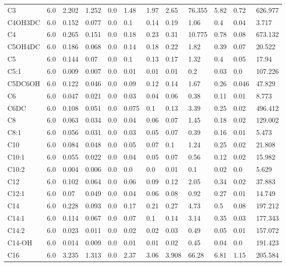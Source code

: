 \begin{tabular}{llllllllllll}
C3 & 6.0 & 2.202 & 1.252 & 0.0 & 1.48 & 1.97 & 2.65 & 76.355 & 5.82 & 0.72 & 626.977 \\
C4OH\C3DC & 6.0 & 0.152 & 0.077 & 0.0 & 0.1 & 0.14 & 0.19 & 1.06 & 0.4 & 0.04 & 3.717 \\
C4 & 6.0 & 0.265 & 0.151 & 0.0 & 0.18 & 0.23 & 0.31 & 10.775 & 0.78 & 0.08 & 673.132 \\
C5OH\C4DC & 6.0 & 0.186 & 0.068 & 0.0 & 0.14 & 0.18 & 0.22 & 1.82 & 0.39 & 0.07 & 20.522 \\
C5 & 6.0 & 0.144 & 0.07 & 0.0 & 0.1 & 0.13 & 0.17 & 1.32 & 0.4 & 0.05 & 17.94 \\
C5:1 & 6.0 & 0.009 & 0.007 & 0.0 & 0.01 & 0.01 & 0.01 & 0.2 & 0.03 & 0.0 & 107.226 \\
C5DC\C6OH & 6.0 & 0.122 & 0.046 & 0.0 & 0.09 & 0.12 & 0.14 & 1.67 & 0.26 & 0.046 & 47.829 \\
C6 & 6.0 & 0.047 & 0.021 & 0.0 & 0.03 & 0.04 & 0.06 & 0.38 & 0.11 & 0.01 & 8.773 \\
C6DC & 6.0 & 0.108 & 0.051 & 0.0 & 0.075 & 0.1 & 0.13 & 3.39 & 0.25 & 0.02 & 496.412 \\
C8 & 6.0 & 0.063 & 0.034 & 0.0 & 0.04 & 0.06 & 0.07 & 1.45 & 0.18 & 0.02 & 129.002 \\
C8:1 & 6.0 & 0.056 & 0.031 & 0.0 & 0.03 & 0.05 & 0.07 & 0.39 & 0.16 & 0.01 & 5.473 \\
C10 & 6.0 & 0.084 & 0.048 & 0.0 & 0.05 & 0.07 & 0.1 & 1.24 & 0.25 & 0.02 & 21.808 \\
C10:1 & 6.0 & 0.055 & 0.022 & 0.0 & 0.04 & 0.05 & 0.07 & 0.56 & 0.12 & 0.02 & 15.982 \\
C10:2 & 6.0 & 0.004 & 0.006 & 0.0 & 0.0 & 0.0 & 0.01 & 0.1 & 0.02 & 0.0 & 5.629 \\
C12 & 6.0 & 0.102 & 0.064 & 0.0 & 0.06 & 0.09 & 0.12 & 2.05 & 0.34 & 0.02 & 37.883 \\
C12:1 & 6.0 & 0.07 & 0.049 & 0.0 & 0.04 & 0.06 & 0.08 & 0.92 & 0.27 & 0.01 & 14.749 \\
C14 & 6.0 & 0.228 & 0.093 & 0.0 & 0.17 & 0.21 & 0.27 & 4.73 & 0.5 & 0.08 & 197.212 \\
C14:1 & 6.0 & 0.114 & 0.067 & 0.0 & 0.07 & 0.1 & 0.14 & 3.14 & 0.35 & 0.03 & 177.343 \\
C14:2 & 6.0 & 0.023 & 0.011 & 0.0 & 0.02 & 0.02 & 0.03 & 0.49 & 0.05 & 0.01 & 157.072 \\
C14-OH & 6.0 & 0.014 & 0.009 & 0.0 & 0.01 & 0.01 & 0.02 & 0.45 & 0.04 & 0.0 & 191.423 \\
C16 & 6.0 & 3.235 & 1.313 & 0.0 & 2.37 & 3.06 & 3.908 & 66.28 & 6.81 & 1.15 & 205.584 \\

\end{tabular}
